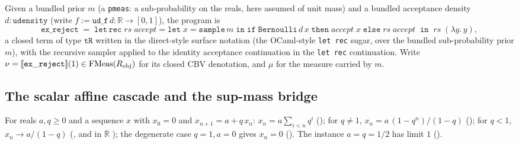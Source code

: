 \begin{definition}%
\label{def:cbv-ex-reject}
\rocqok
{}
Given a bundled prior $m$ (a \texttt{pmeas}: a sub-probability on
the reals, here assumed of unit mass) and a bundled acceptance
density $d : \mathtt{udensity}$ (write $f := \mathtt{ud\_f}\,d :
\mathbb{R} \to [0, 1]$), the program is
\[
  \mathtt{ex\_reject}
  \;=\;
  \mathtt{let\,rec}\;\textit{rs}\;\textit{accept} =
    \mathtt{let}\;x = \mathtt{sample}\,m\;\mathtt{in}\;
    \mathtt{if}\;\mathtt{Bernoulli}\,d\,x\;
    \mathtt{then}\;\textit{accept}\;x\;
    \mathtt{else}\;\textit{rs}\;\textit{accept}
  \;\;\mathtt{in}\;\;
  \textit{rs}\;(\lambda y.\,y),
\]
a closed term of type $\mathtt{tR}$ written in the direct-style
surface notation (the OCaml-style \texttt{let rec} sugar, over the
bundled sub-probability prior $m$), with the recursive sampler
applied to the identity acceptance continuation in the
\texttt{let rec} continuation. Write
$\nu = [\![ \mathtt{ex\_reject} ]\!](1) \in \mathrm{FMeas}(R_\mathrm{obj})$ for
its closed CBV denotation, and $\mu$ for the measure carried by $m$.
\end{definition}

\subsection{The scalar affine cascade and the sup-mass bridge}%
\label{ssec:cbv-affine-cascade}

\begin{lemma}%
\label{lem:cbv-affine-cascade}
\rocqok
{}\rocqok
{}\rocqok
{}
For reals $a, q \geq 0$ and a sequence $x$ with $x_0 = 0$ and
$x_{n+1} = a + q\,x_n$:
$x_n = a \sum_{i < n} q^i$
();
for $q \neq 1$, $x_n = a\,(1 - q^n)/(1 - q)$
();
for $q < 1$, $x_n \to a / (1 - q)$
(,
and in $\overline{\mathbb{R}}$
); the
degenerate case $q = 1, a = 0$ gives $x_n = 0$
().
The instance $a = q = 1/2$ has limit $1$
().
\end{lemma}

